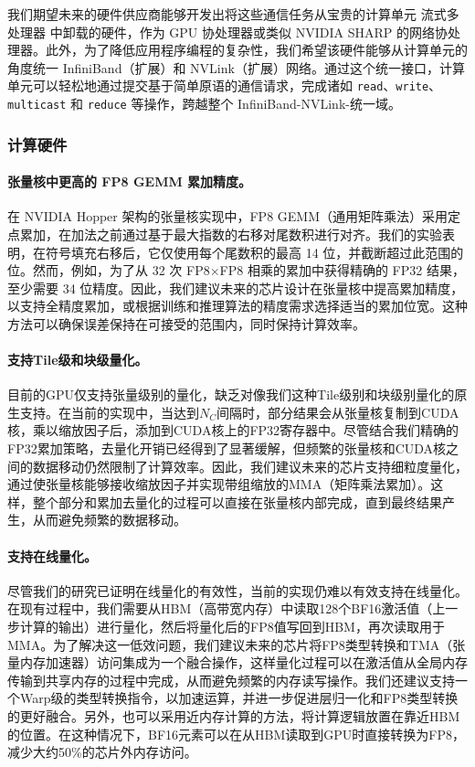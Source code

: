 \documentclass[lang=cn,a4paper,newtx]{elegantpaper}
\begin{document}
我们期望未来的硬件供应商能够开发出将这些通信任务从宝贵的计算单元 流式多处理器 中卸载的硬件，作为 GPU 协处理器或类似 NVIDIA SHARP 的网络协处理器。此外，为了降低应用程序编程的复杂性，我们希望该硬件能够从计算单元的角度统一 InfiniBand（扩展）和 NVLink（扩展）网络。通过这个统一接口，计算单元可以轻松地通过提交基于简单原语的通信请求，完成诸如 \texttt{read}、\texttt{write}、\texttt{multicast} 和 \texttt{reduce} 等操作，跨越整个 InfiniBand-NVLink-统一域。

\subsubsection{计算硬件}

\paragraph{张量核中更高的 FP8 GEMM 累加精度。}
在 NVIDIA Hopper 架构的张量核实现中，FP8 GEMM（通用矩阵乘法）采用定点累加，在加法之前通过基于最大指数的右移对尾数积进行对齐。我们的实验表明，在符号填充右移后，它仅使用每个尾数积的最高 14 位，并截断超过此范围的位。然而，例如，为了从 32 次 FP8$\times$FP8 相乘的累加中获得精确的 FP32 结果，至少需要 34 位精度。因此，我们建议未来的芯片设计在张量核中提高累加精度，以支持全精度累加，或根据训练和推理算法的精度需求选择适当的累加位宽。这种方法可以确保误差保持在可接受的范围内，同时保持计算效率。

\paragraph{支持Tile级和块级量化。}
目前的GPU仅支持张量级别的量化，缺乏对像我们这种Tile级别和块级别量化的原生支持。在当前的实现中，当达到$N_C$间隔时，部分结果会从张量核复制到CUDA核，乘以缩放因子后，添加到CUDA核上的FP32寄存器中。尽管结合我们精确的FP32累加策略，去量化开销已经得到了显著缓解，但频繁的张量核和CUDA核之间的数据移动仍然限制了计算效率。因此，我们建议未来的芯片支持细粒度量化，通过使张量核能够接收缩放因子并实现带组缩放的MMA（矩阵乘法累加）。这样，整个部分和累加去量化的过程可以直接在张量核内部完成，直到最终结果产生，从而避免频繁的数据移动。

\paragraph{支持在线量化。}
尽管我们的研究已证明在线量化的有效性，当前的实现仍难以有效支持在线量化。在现有过程中，我们需要从HBM（高带宽内存）中读取128个BF16激活值（上一步计算的输出）进行量化，然后将量化后的FP8值写回到HBM，再次读取用于MMA。为了解决这一低效问题，我们建议未来的芯片将FP8类型转换和TMA（张量内存加速器）访问集成为一个融合操作，这样量化过程可以在激活值从全局内存传输到共享内存的过程中完成，从而避免频繁的内存读写操作。我们还建议支持一个Warp级的类型转换指令，以加速运算，并进一步促进层归一化和FP8类型转换的更好融合。另外，也可以采用近内存计算的方法，将计算逻辑放置在靠近HBM的位置。在这种情况下，BF16元素可以在从HBM读取到GPU时直接转换为FP8，减少大约50\%的芯片外内存访问。
\end{document}
